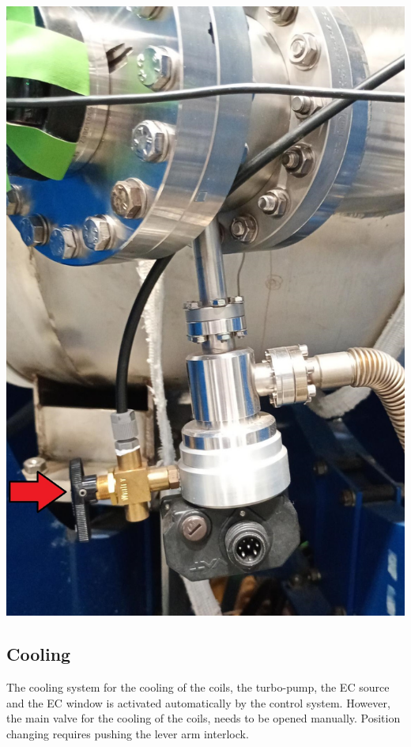 \documentclass[fleqn,a4paper,20pt]{article}
\begin{document}
\begin{minipage}{.3\textwidth}
	\centering
	\includegraphics[width=\linewidth]{Gas3}
	\label{Gas3}
\end{minipage}	
			

\subsection{Cooling}

The cooling system for the cooling of the coils, the turbo-pump, the EC source and the EC window is activated automatically by the control system. However, the main valve for the cooling of the coils, needs to be opened manually. Position changing requires pushing the lever arm interlock.\\
\end{document}
